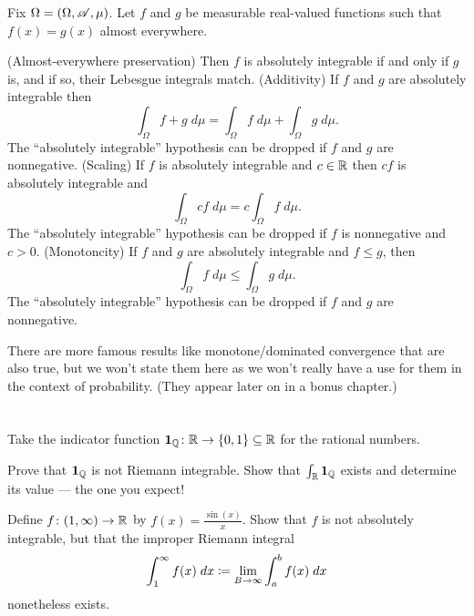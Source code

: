 Fix $\Omega = (\Omega, \mathscr A, \mu)$.
Let $f$ and $g$ be measurable real-valued functions
such that $f(x) = g(x)$ almost everywhere.
\begin{itemize}
	\ii (Almost-everywhere preservation)
	Then $f$ is absolutely integrable if and only if $g$ is,
	and if so, their Lebesgue integrals match.
	\ii (Additivity)
	If $f$ and $g$ are absolutely integrable then
	\[ \int_\Omega f+g \; d\mu
		= \int_\Omega f \; d\mu
		+ \int_\Omega g \; d\mu. \]
	The ``absolutely integrable'' hypothesis can be dropped
	if $f$ and $g$ are nonnegative.
	\ii (Scaling) If $f$ is absolutely integrable and $c \in \mathbb R$
	then $cf$ is absolutely integrable and
	\[ \int_\Omega cf \; d\mu = c \int_\Omega f \; d\mu. \]
	The ``absolutely integrable'' hypothesis can be dropped
	if $f$ is nonnegative and $c > 0$.
	\ii (Monotoncity)
	If $f$ and $g$ are absolutely integrable and $f \le g$, then
	\[ \int_\Omega f \; d\mu \le \int_\Omega g \; d\mu. \]
	The ``absolutely integrable'' hypothesis can be dropped
	if $f$ and $g$ are nonnegative.
\end{itemize}
There are more famous results like monotone/dominated convergence
that are also true, but we won't state them here
as we won't really have a use for them in the context of probability.
(They appear later on in a bonus chapter.)

\section{\problemhead}

\begin{dproblem}
	Take the indicator function
	$\mathbf 1_{\mathbb Q} \colon \mathbb R \to \{0,1\} \subseteq \mathbb R$
	for the rational numbers.
	\begin{enumerate}[(a)]
		\ii Prove that $\mathbf{1}_\mathbb Q$ is not Riemann integrable.
		\ii Show that $\int_\mathbb R \mathbf{1}_\mathbb Q$ exists
		and determine its value --- the one you expect!
	\end{enumerate}
\end{dproblem}

\begin{dproblem}
	\label{prob:sin_improper}
	Define $f \colon (1,\infty) \to \mathbb R$ by $f(x) = \frac{\sin(x)}{x}$.
	Show that $f$ is not absolutely integrable,
	but that the improper Riemann integral
	\[ \int_1^\infty f(x) \; dx \coloneqq
		\lim_{B \to \infty}
		\int_a^b f(x) \; dx \]
	nonetheless exists.
\end{dproblem}
